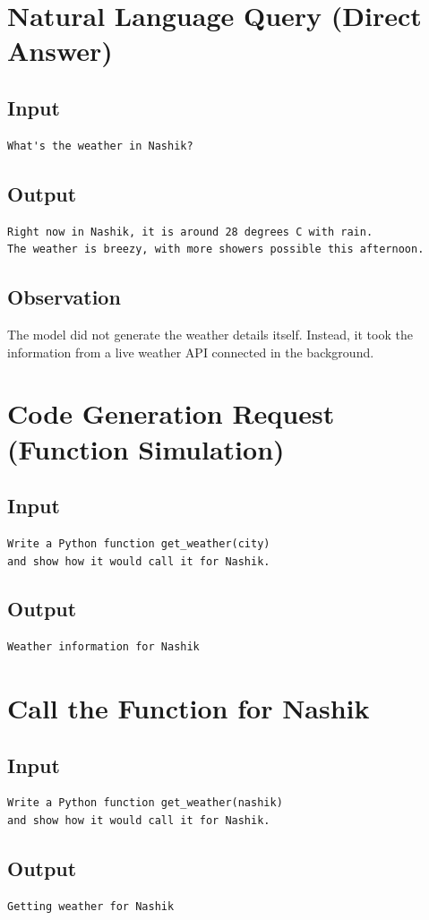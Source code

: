 \documentclass[12pt]{article}
\begin{document}
\section{Natural Language Query (Direct Answer)}

\subsection*{Input}
\begin{verbatim}
What's the weather in Nashik?
\end{verbatim}

\subsection*{Output}
\begin{verbatim}
Right now in Nashik, it is around 28 degrees C with rain.
The weather is breezy, with more showers possible this afternoon.
\end{verbatim}

\subsection*{Observation}
The model did not generate the weather details itself. Instead, it took the information from a live weather API connected in the background.


\section{Code Generation Request (Function Simulation)}

\subsection*{Input}
\begin{verbatim}
Write a Python function get_weather(city)
and show how it would call it for Nashik.
\end{verbatim}

\subsection*{Output}
\begin{verbatim}
Weather information for Nashik
\end{verbatim}


\section{Call the Function for Nashik}

\subsection*{Input}
\begin{verbatim}
Write a Python function get_weather(nashik)
and show how it would call it for Nashik.
\end{verbatim}

\subsection*{Output}
\begin{verbatim}
Getting weather for Nashik
\end{verbatim}
\end{document}
